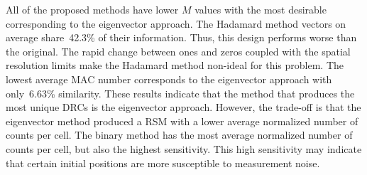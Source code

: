 \documentclass[twocolumn,10pt,final]{asme2ej}
\begin{document}
All of the proposed methods have lower $M$ values with the most desirable corresponding to the eigenvector approach.  
The Hadamard method vectors on average share~42.3\% of their information. Thus, this design performs worse than the original.  
The rapid change between ones and zeros coupled with the spatial resolution limits make the Hadamard method non-ideal for this problem.  
The lowest average MAC number corresponds to the eigenvector approach with only~6.63\% similarity.  
These results indicate that the method that produces the most unique
DRCs is the eigenvector approach.  
However, the trade-off is that the eigenvector method produced a RSM with a lower average normalized number of counts per cell.  
The binary method has the most average normalized number of counts per cell, but also the highest sensitivity.  
This high sensitivity may indicate that certain initial positions are more susceptible to measurement noise.



\vspace{-0.3 cm}








\end{document}
